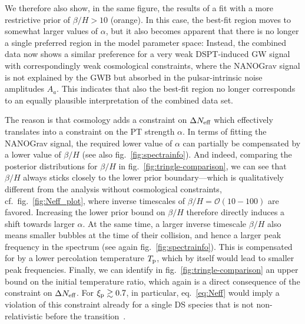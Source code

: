 We therefore also show, in the same figure, the results of a fit with a more restrictive prior of $\beta/H > 10$ (\textcolor{DESYorange}{orange}).  In this case, the best-fit region moves to somewhat larger values of $\alpha$, but it also becomes apparent that there is no  longer a single preferred region in the model parameter space: Instead, the combined data now shows a similar preference for a very weak \ac{DSPT}-induced \ac{GW} signal with correspondingly weak cosmological constraints, where the \ac{NANOGrav} signal is not explained by the \ac{GWB} but absorbed in the pulsar-intrinsic noise amplitudes $A_a$. This indicates that also the best-fit region no longer corresponds to an equally plausible interpretation of the combined data set.

The reason is that cosmology adds a constraint on $\Delta N_\text{eff} $ which effectively translates into a constraint on the \ac{PT} strength $\alpha$. In terms of fitting the  \ac{NANOGrav} signal, the required lower value of $\alpha$ can partially be compensated by a lower value of $\beta/H$ (see also fig.~\ref{fig:spectrainfo}). And indeed, comparing the posterior distributions for $\beta/H$ in fig.~\ref{fig:tringle-comparison}, we can see that $\beta/H$ always sticks closely to the lower prior boundary---which is qualitatively different from the analysis without cosmological constraints, cf.~fig.~\ref{fig:Neff_plot}, where inverse timescales of $\beta/H = \mathcal{O}(10-100)$ are favored. Increasing the lower prior bound on $\beta/H$ therefore  directly induces a shift towards larger $\alpha$. At the same time, a larger inverse timescale $\beta/H$ also means smaller bubbles at the time of their collision,  and hence a larger peak frequency in the spectrum (see again fig.~\ref{fig:spectrainfo}). This is compensated for by a  lower percolation temperature $T_{\text{p}}$, which by itself would lead to smaller peak frequencies. Finally, we can identify  in fig.~\ref{fig:tringle-comparison} an upper bound on the initial  temperature ratio, which again is a direct consequence of the constraint on $\Delta N_\text{eff} $. For $\xi_{\text{p}} \gtrsim 0.7$, in particular, eq.~\eqref{eq:Neff} would imply a violation of this constraint already for a single \ac{DS} species that is not non-relativistic before the transition~\cite{Breitbach:2018ddu}.

